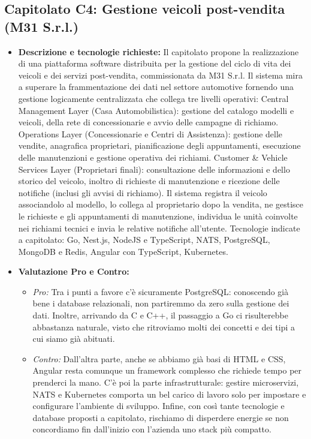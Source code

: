 \documentclass[12pt,a4paper]{article}
\newcommand{\tightlist}{\setlength{\itemsep}{1pt}\setlength{\parskip}{0pt}}
\begin{document}
\hypertarget{capitolato-c4}{%
\subsection{Capitolato C4: Gestione veicoli post-vendita (M31 S.r.l.)}}
\begin{itemize}
\tightlist
\item \textbf{Descrizione e tecnologie richieste:} Il capitolato propone la realizzazione di una piattaforma software distribuita per la gestione del ciclo di vita dei veicoli e dei servizi post-vendita, commissionata da M31 S.r.l. Il sistema mira a superare la frammentazione dei dati nel settore automotive fornendo una gestione logicamente centralizzata che collega tre livelli operativi:
Central Management Layer (Casa Automobilistica): gestione del catalogo modelli e veicoli, della rete di concessionarie e avvio delle campagne di richiamo.
Operations Layer (Concessionarie e Centri di Assistenza): gestione delle vendite, anagrafica proprietari, pianificazione degli appuntamenti, esecuzione delle manutenzioni e gestione operativa dei richiami.
Customer \& Vehicle Services Layer (Proprietari finali): consultazione delle informazioni e dello storico del veicolo, inoltro di richieste di manutenzione e ricezione delle notifiche (inclusi gli avvisi di richiamo).
Il sistema registra il veicolo associandolo al modello, lo collega al proprietario dopo la vendita, ne gestisce le richieste e gli appuntamenti di manutenzione, individua le unità coinvolte nei richiami tecnici e invia le relative notifiche all'utente.
Tecnologie indicate a capitolato: Go, Nest.js, NodeJS e TypeScript, NATS, PostgreSQL, MongoDB e Redis, Angular con TypeScript, Kubernetes.

\item \textbf{Valutazione Pro e Contro:}
  \begin{itemize}
  \tightlist
  \item \emph{Pro:} Tra i punti a favore c'è sicuramente PostgreSQL: conoscendo già bene i database relazionali, non partiremmo da zero sulla gestione dei dati. Inoltre, arrivando da C e C++, il passaggio a Go ci risulterebbe abbastanza naturale, visto che ritroviamo molti dei concetti e dei tipi a cui siamo già abituati. 

  \item \emph{Contro:} Dall'altra parte, anche se abbiamo già basi di HTML e CSS, Angular resta comunque un framework complesso che richiede tempo per prenderci la mano. C'è poi la parte infrastrutturale: gestire microservizi, NATS e Kubernetes comporta un bel carico di lavoro solo per impostare e configurare l'ambiente di sviluppo. Infine, con così tante tecnologie e database proposti a capitolato, rischiamo di disperdere energie se non concordiamo fin dall'inizio con l'azienda uno stack più compatto.


\end{itemize}
\end{itemize}
\end{document}
